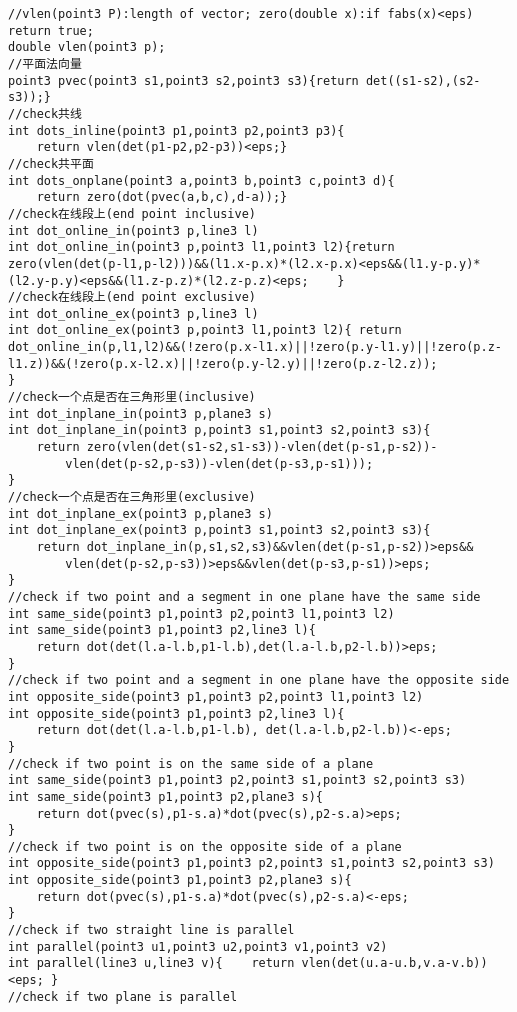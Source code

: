 \begin{lstlisting}
//vlen(point3 P):length of vector; zero(double x):if fabs(x)<eps) return true;
double vlen(point3 p);
//平面法向量
point3 pvec(point3 s1,point3 s2,point3 s3){return det((s1-s2),(s2-s3));}
//check共线
int dots_inline(point3 p1,point3 p2,point3 p3){
    return vlen(det(p1-p2,p2-p3))<eps;}
//check共平面
int dots_onplane(point3 a,point3 b,point3 c,point3 d){
    return zero(dot(pvec(a,b,c),d-a));}
//check在线段上(end point inclusive)
int dot_online_in(point3 p,line3 l)
int dot_online_in(point3 p,point3 l1,point3 l2){return zero(vlen(det(p-l1,p-l2)))&&(l1.x-p.x)*(l2.x-p.x)<eps&&(l1.y-p.y)*(l2.y-p.y)<eps&&(l1.z-p.z)*(l2.z-p.z)<eps;    }
//check在线段上(end point exclusive)
int dot_online_ex(point3 p,line3 l)
int dot_online_ex(point3 p,point3 l1,point3 l2){ return dot_online_in(p,l1,l2)&&(!zero(p.x-l1.x)||!zero(p.y-l1.y)||!zero(p.z-l1.z))&&(!zero(p.x-l2.x)||!zero(p.y-l2.y)||!zero(p.z-l2.z));
}
//check一个点是否在三角形里(inclusive)
int dot_inplane_in(point3 p,plane3 s)
int dot_inplane_in(point3 p,point3 s1,point3 s2,point3 s3){
    return zero(vlen(det(s1-s2,s1-s3))-vlen(det(p-s1,p-s2))-
        vlen(det(p-s2,p-s3))-vlen(det(p-s3,p-s1)));
}
//check一个点是否在三角形里(exclusive)
int dot_inplane_ex(point3 p,plane3 s)
int dot_inplane_ex(point3 p,point3 s1,point3 s2,point3 s3){
    return dot_inplane_in(p,s1,s2,s3)&&vlen(det(p-s1,p-s2))>eps&&
        vlen(det(p-s2,p-s3))>eps&&vlen(det(p-s3,p-s1))>eps;
}
//check if two point and a segment in one plane have the same side
int same_side(point3 p1,point3 p2,point3 l1,point3 l2)
int same_side(point3 p1,point3 p2,line3 l){
    return dot(det(l.a-l.b,p1-l.b),det(l.a-l.b,p2-l.b))>eps;
}
//check if two point and a segment in one plane have the opposite side
int opposite_side(point3 p1,point3 p2,point3 l1,point3 l2)
int opposite_side(point3 p1,point3 p2,line3 l){
    return dot(det(l.a-l.b,p1-l.b), det(l.a-l.b,p2-l.b))<-eps;
}
//check if two point is on the same side of a plane
int same_side(point3 p1,point3 p2,point3 s1,point3 s2,point3 s3)
int same_side(point3 p1,point3 p2,plane3 s){
    return dot(pvec(s),p1-s.a)*dot(pvec(s),p2-s.a)>eps;
}
//check if two point is on the opposite side of a plane
int opposite_side(point3 p1,point3 p2,point3 s1,point3 s2,point3 s3)
int opposite_side(point3 p1,point3 p2,plane3 s){
    return dot(pvec(s),p1-s.a)*dot(pvec(s),p2-s.a)<-eps;
}
//check if two straight line is parallel
int parallel(point3 u1,point3 u2,point3 v1,point3 v2)
int parallel(line3 u,line3 v){    return vlen(det(u.a-u.b,v.a-v.b))<eps; }
//check if two plane is parallel

\end{lstlisting}
